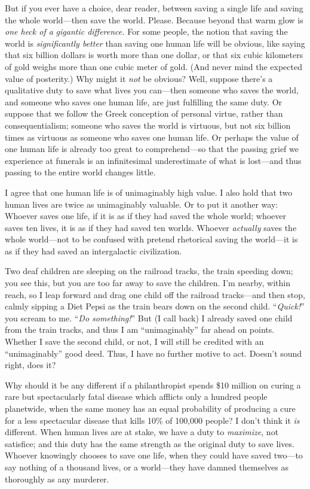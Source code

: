 {
 But if you ever have a choice, dear reader, between saving a
single life and saving the whole world---then save the world. Please.
Because beyond that warm glow is \textit{one heck of a}
\textit{gigantic difference.} For some people, the notion that saving
the world is \textit{significantly better} than saving one human life
will be obvious, like saying that six billion dollars is worth more
than one dollar, or that six cubic kilometers of gold weighs more than
one cubic meter of gold. (And never mind the expected value of
posterity.) Why might it \textit{not} be obvious? Well, suppose
there's a qualitative duty to save what lives you
can---then someone who saves the world, and someone who saves one human
life, are just fulfilling the same duty. Or suppose that we follow the
Greek conception of personal virtue, rather than consequentialism;
someone who saves the world is virtuous, but not six billion times as
virtuous as someone who saves one human life. Or perhaps the value of
one human life is already too great to comprehend---so that the passing
grief we experience at funerals is an infinitesimal underestimate of
what is lost---and thus passing to the entire world changes little.}

{
 I agree that one human life is of unimaginably high value. I also
hold that two human lives are twice as unimaginably valuable. Or to put
it another way: Whoever saves one life, if it is as if they had saved
the whole world; whoever saves ten lives, it is as if they had saved
ten worlds. Whoever \textit{actually} saves the whole world---not to be
confused with pretend rhetorical saving the world---it is as if they
had saved an intergalactic civilization.}

{
 Two deaf children are sleeping on the railroad tracks, the train
speeding down; you see this, but you are too far away to save the
children. I'm nearby, within reach, so I leap forward
and drag one child off the railroad tracks---and then stop, calmly
sipping a Diet Pepsi as the train bears down on the second child.
``\textit{Quick!}'' you scream to
me. ``\textit{Do something!}'' But
(I call back) I already saved one child from the train tracks, and thus
I am ``unimaginably'' far ahead on
points. Whether I save the second child, or not, I will still be
credited with an ``unimaginably''
good deed. Thus, I have no further motive to act.
Doesn't sound right, does it?}

{
 Why should it be any different if a philanthropist spends \$10
million on curing a rare but spectacularly fatal disease which afflicts
only a hundred people planetwide, when the same money has an equal
probability of producing a cure for a less spectacular disease that
kills 10\% of 100,000 people? I don't think it
\textit{is} different. When human lives are at stake, we have a duty to
\textit{maximize}, not satisfice; and this duty has the same strength
as the original duty to save lives. Whoever knowingly chooses to save
one life, when they could have saved two---to say nothing of a thousand
lives, or a world---they have damned themselves as thoroughly as any
murderer.}

